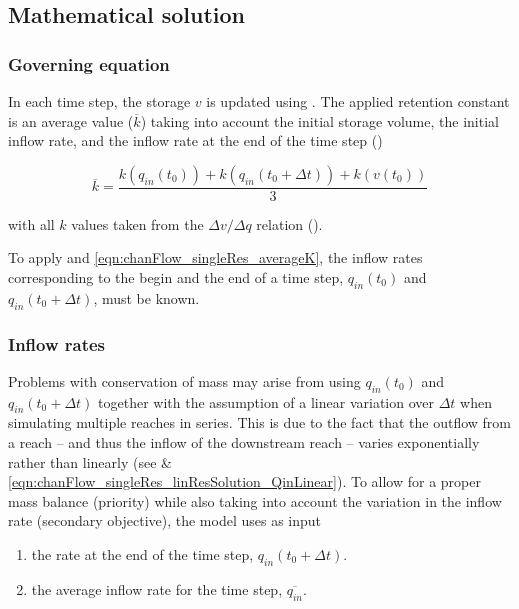 \subsection{Mathematical solution} \label{sec:chanFlow_singleRes_solution}

\subsubsection*{Governing equation}

In each time step, the storage $v$ is updated using . The applied retention constant is an average value ($\overline{k}$) taking into account the initial storage volume, the initial inflow rate, and the inflow rate at the end of the time step ()

\begin{equation} \label{eqn:chanFlow_singleRes_averageK}
  \overline{k} = \frac{k(q_{in}(t_0)) + k(q_{in}(t_0 + \Delta t)) + k(v(t_0))}{3}
\end{equation}

with all $k$ values taken from the $\Delta v/\Delta q$ relation ().

To apply  and \ref{eqn:chanFlow_singleRes_averageK}, the inflow rates corresponding to the begin and the end of a time step, $q_{in}(t_0)$ and $q_{in}(t_0 + \Delta t)$, must be known.

\subsubsection*{Inflow rates}

Problems with conservation of mass may arise from using $q_{in}(t_0)$ and $q_{in}(t_0 + \Delta t)$ together with the assumption of a linear variation over $\Delta t$ when simulating multiple reaches in series. This is due to the fact that the outflow from a reach -- and thus the inflow of the downstream reach -- varies exponentially rather than linearly (see  \& \ref{eqn:chanFlow_singleRes_linResSolution_QinLinear}). To allow for a proper mass balance (priority) while also taking into account the variation in the inflow rate (secondary objective), the model uses as input
\begin{enumerate}
  \item the rate at the end of the time step, $q_{in}(t_0 + \Delta t)$.
  \item the average inflow rate for the time step, $\overline{q_{in}}$.
\end{enumerate}

